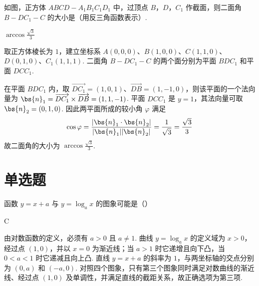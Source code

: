 \documentclass[UTF8,a4paper,oneside,11pt]{ctexbook}
\begin{document}
\begin{problem}
如图，正方体 \(ABCD - A_1B_1C_1D_1\) 中，过顶点 \(B\)，\(D\)，\(C_1\) 作截面，则二面角 \(B - DC_1 - C\) 的大小是\fillinblank{}（用反三角函数表示）.

\begin{minipage}{\linewidth}
\end{minipage}
\end{problem}

\begin{answer}
\(\arccos \frac{\sqrt{3}}{3}\)
\end{answer}

\begin{solution}
取正方体棱长为 \(1\)，建立坐标系
\(A(0,0,0)\)、\(B(1,0,0)\)、\(C(1,1,0)\)、\(D(0,1,0)\)、\(C_1(1,1,1)\). 二面角 \(B-DC_1-C\) 的两个面分别为平面 \(BDC_1\) 和平面 \(DCC_1\).

在平面 \(BDC_1\) 内，取
\(\overrightarrow{DC_1}=(1,0,1)\)、\(\overrightarrow{DB}=(1,-1,0)\)，则该平面的一个法向量为
\(\bs{n}_1=\overrightarrow{DC_1}\times\overrightarrow{DB}=(1,1,-1)\). 平面 \(DCC_1\) 是 \(y=1\)，其法向量可取 \(\bs{n}_2=(0,1,0)\). 因此两平面所成的较小角 \(\varphi\) 满足
\[
\cos\varphi=\frac{|\bs{n}_1\cdot\bs{n}_2|}{|\bs{n}_1||\bs{n}_2|}=\frac{1}{\sqrt{3}}=\frac{\sqrt{3}}{3}
\]
故二面角的大小为 \(\arccos\frac{\sqrt{3}}{3}\).
\end{solution}

\section{单选题}

\begin{problem}
函数 \(y = x + a\) 与 \(y = \log_a x\) 的图象可能是（\quad）

\choices
    {}
    {}
    {}
    {}
\end{problem}

\begin{answer}
C
\end{answer}

\begin{solution}
由对数函数的定义，必须有 \(a>0\) 且 \(a\neq 1\). 曲线 \(y=\log_a x\) 的定义域为 \(x>0\)，经过点 \((1,0)\)，并以 \(x=0\) 为渐近线；当 \(a>1\) 时它递增且向下凸，当 \(0<a<1\) 时它递减且向上凸. 直线 \(y=x+a\) 的斜率为 \(1\)，与两坐标轴的交点分别为 \((0,a)\) 和 \((-a,0)\). 对照四个图象，只有第三个图象同时满足对数曲线的渐近线、经过点 \((1,0)\) 及单调性，并满足直线的截距关系，故正确选项为第三项.
\end{solution}
\end{document}
